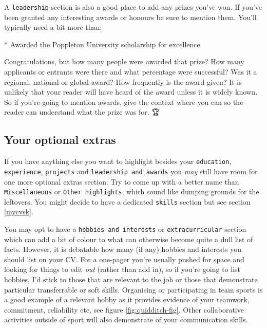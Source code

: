 \documentclass[
]{book}
\newenvironment{Shaded}{\begin{snugshade}}{\end{snugshade}}
\newcommand{\NormalTok}[1]{#1}
\newcommand{\SpecialStringTok}[1]{\textcolor[rgb]{0.31,0.60,0.02}{#1}}
\begin{document}
A \texttt{leadership} section is also a good place to add any prizes you've won. If you've been granted any interesting awards or honours be sure to mention them. You'll typically need a bit more than:

\begin{Shaded}
\begin{Highlighting}[]
\SpecialStringTok{* }\NormalTok{Awarded the Poppleton University scholarship for excellence}
\end{Highlighting}
\end{Shaded}

Congratulations, but how many people were awarded that prize? How many applicants or entrants were there and what percentage were successful? Was it a regional, national or global award? How frequently is the award given? It is unlikely that your reader will have heard of the award unless it is widely known. So if you're going to mention awards, give the context where you can so the reader can understand what the prize was for. 🏆

\hypertarget{misc}{%
\subsection{Your optional extras}\label{misc}}

If you have anything else you want to highlight besides your \texttt{education}, \texttt{experience}, \texttt{projects} and \texttt{leadership\ and\ awards} you \emph{may} still have room for one more optional extras section. Try to come up with a better name than \texttt{Miscellaneous} or \texttt{Other\ highlights}, which sound like dumping grounds for the leftovers. You might decide to have a dedicated \texttt{skills} section but see section \ref{mycvsk}.

You may opt to have a \texttt{hobbies\ and\ interests} or \texttt{extracurricular} section which can add a bit of colour to what can otherwise become quite a dull list of facts. However, it is debatable how many (if any) hobbies and interests you should list on your CV. For a one-pager you're usually pushed for space and looking for things to edit \emph{out} (rather than add in), so if you're going to list hobbies, I'd stick to those that are relevant to the job or those that demonstrate particular transferrable or soft skills. Organising or participating in team sports is a good example of a relevant hobby as it provides evidence of your teamwork, commitment, reliability etc, see figure \ref{fig:quidditch-fig}. Other collaborative activities outside of sport will also demonstrate of your communication skills. \citep{hobbies}
\end{document}
